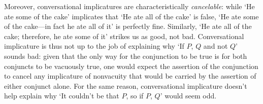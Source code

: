 \documentclass[If.tex]{subfiles}
\begin{document}
Moreover, conversational implicatures are characteristically \emph{cancelable}: while ‘He ate some of the cake’ implicates that ‘He ate all of the cake’ is false, ‘He ate some of the cake---in fact he ate all of it’ is perfectly fine.  Similarly, ‘He ate all of the cake; therefore, he ate some of it’ strikes us as good, not bad.  Conversational implicature is thus not up to the job of explaining why ‘If $P$, $Q$ and not $Q$’ sounds bad: given that the only way for the conjunction to be true is for both conjuncts to be vacuously true, one would expect the assertion of the conjunction to cancel any implicature of nonvacuity that would be carried by the assertion of either conjunct alone.  For the same reason, conversational implicature doesn't help explain why ‘It couldn't be that $P$, so if $P$, $Q$’ would seem odd.  

\end{document}
